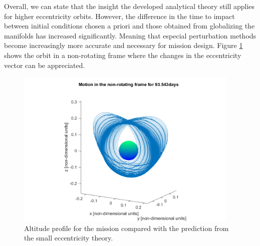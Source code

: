 Overall, we can state that the insight the developed analytical theory still applies for higher eccentricity orbits. However, the difference in the time to impact between initial conditions chosen a priori and those obtained from globalizing the manifolds has increased significantly. Meaning that especial perturbation methods become increasingly more accurate and necessary for mission design. Figure \ref{fig:JUICEorbit} shows the orbit in a non-rotating frame where the changes in the eccentricity vector can be appreciated.

\begin{figure}[H]
	\centering
	\includegraphics[height=3in]
	{figures/GanymedeESA/motionFixedFrame.png}
	\caption{Altitude profile for the mission compared with the prediction from the small eccentricity theory.}
	\label{fig:JUICEorbit}
\end{figure}

